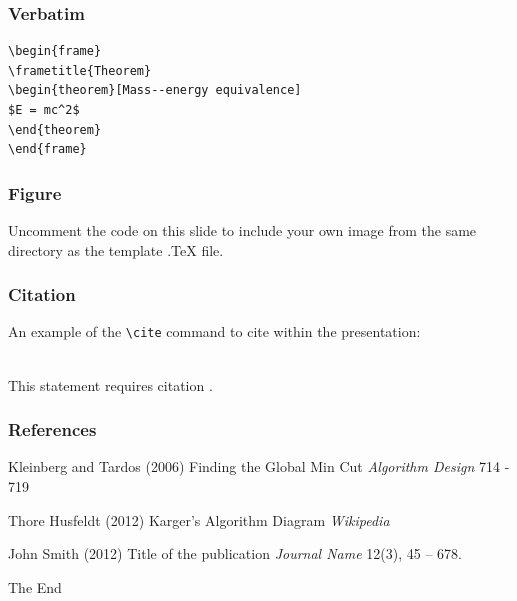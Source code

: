 \documentclass{beamer}
\begin{document}

\begin{frame}[fragile] %
\frametitle{Verbatim}
\begin{example}
\begin{verbatim}
\begin{frame}
\frametitle{Theorem}
\begin{theorem}[Mass--energy equivalence]
$E = mc^2$
\end{theorem}
\end{frame}\end{verbatim}
\end{example}
\end{frame}


\begin{frame}
\frametitle{Figure}
Uncomment the code on this slide to include your own image from the same directory as the template .TeX file.
\end{frame}


\begin{frame}[fragile] %
\frametitle{Citation}
An example of the \verb|\cite| command to cite within the presentation:\\~

This statement requires citation \cite{p1}.
\end{frame}


\begin{frame}
\frametitle{References}
\footnotesize{
\begin{thebibliography}{99} %
 Kleinberg and Tardos (2006)
\newblock Finding the Global Min Cut
\newblock \emph{Algorithm Design} 714 - 719



 Thore Husfeldt  (2012)
\newblock Karger's Algorithm Diagram
\newblock \emph{Wikipedia} 

 John Smith (2012)
\newblock Title of the publication
\newblock \emph{Journal Name} 12(3), 45 -- 678.
\end{thebibliography}
}
\end{frame}


\begin{frame}
\Huge{\centerline{The End}}
\end{frame}

\end{document}
